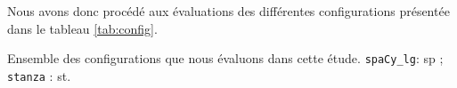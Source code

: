 Nous avons donc procédé aux évaluations des différentes configurations présentée dans le tableau \ref{tab:config}.

\begin{table}[h!]
    \centering
   
    \caption{Ensemble des configurations que nous évaluons dans cette étude. \texttt{spaCy\_lg}: sp ; \texttt{stanza} : st.}
    \label{tab:config}
\end{table}




